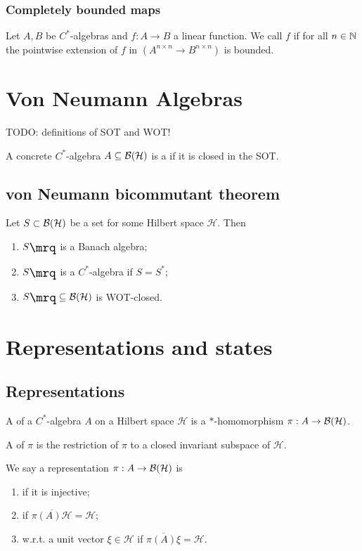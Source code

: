 \subsection{Completely bounded maps}
\begin{definition}
Let $A,B$ be $C^*$-algebras and $f:A\to B$ a linear function. We call $f$  if for all $n\in\mathbb{N}$ the pointwise extension of $f$ in $(A^{n\times n}\to B^{n\times n})$ is bounded.
\end{definition}

\chapter{Von Neumann Algebras}
TODO: definitions of SOT and WOT!
\begin{definition}
A concrete $C^*$-algebra $A\subseteq \operatorname{\mathcal{B}}(\mathcal{H})$ is a  if it is closed in the SOT.
\end{definition}

\section{von Neumann bicommutant theorem}
\begin{proposition} \label{commutantBanachAlgebra}
Let $S\subset \operatorname{\mathcal{B}}(\mathcal{H})$ be a set for some Hilbert space $\mathcal{H}$. Then
\begin{enumerate}
\item $\comm{S}$ is a Banach algebra;
\item $\comm{S}$ is a $C^*$-algebra if $S = S^*$;
\item $\comm{S}\subseteq \Bounded(\mathcal{H})$ is WOT-closed.
\end{enumerate}
\end{proposition}

\chapter{Representations and states}
\section{Representations}
\begin{definition}
A  of a $C^*$-algebra $A$ on a Hilbert space $\mathcal{H}$ is a $*$-homomorphism $\pi: A \to \operatorname{\mathcal{B}}(\mathcal{H})$.

A  of $\pi$ is the restriction of $\pi$ to a closed invariant subspace of $\mathcal{H}$.

We say a representation $\pi: A \to \operatorname{\mathcal{B}}(\mathcal{H})$ is
\begin{enumerate}
\item {} if it is injective;
\item {} if $\overline{\pi(A)\mathcal{H}} = \mathcal{H}$;
\item {} w.r.t. a unit vector $\xi\in\mathcal{H}$ if $\overline{\pi(A)\xi} = \mathcal{H}$.
\end{enumerate}
\end{definition}

